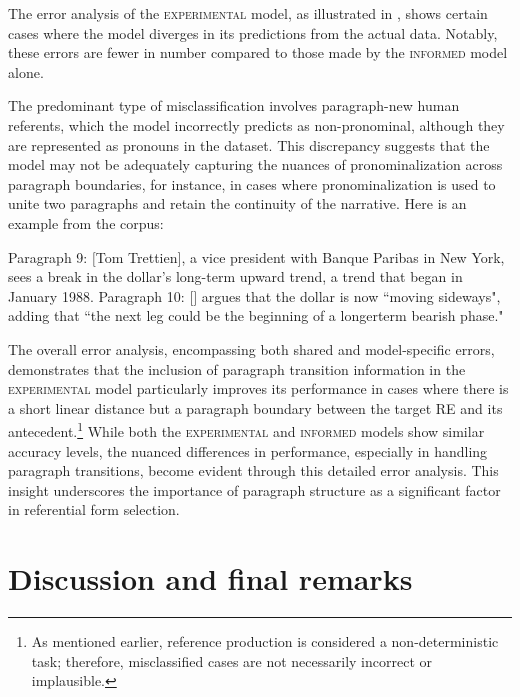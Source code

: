 The error analysis of the \textsc{experimental} model, as illustrated in , shows certain cases where the model diverges in its predictions from the actual data. Notably, these errors are fewer in number compared to those made by the \textsc{informed} model alone.

{\renewcommand\normalsize{\footnotesize}%
	\normalsize
	}

The predominant type of misclassification involves paragraph-new human referents, which the model incorrectly predicts as non-pronominal, although they are represented as pronouns in the dataset. This discrepancy suggests that the model may not be adequately capturing the nuances of pronominalization across paragraph boundaries, for instance, in cases where pronominalization is used to unite two paragraphs and retain the continuity of the narrative. Here is an example from the corpus:


\begin{exe}
	\ex \example{wsj-1102}
	\begin{xlist}
		\ex Paragraph 9: $[$Tom Trettien$]$, a vice president with Banque Paribas in New York, sees a break in the dollar's long-term upward trend, a trend that began in January 1988.
		\ex Paragraph 10: $[$$]$ argues that the dollar is now ``moving sideways", adding that ``the next leg could be the beginning of a longerterm bearish phase."
	\end{xlist} 
\end{exe}


The overall error analysis, encompassing both shared and model-specific errors, demonstrates that the inclusion of paragraph transition information in the \textsc{experimental} model particularly improves its performance in cases where there is a short linear distance but a paragraph boundary between the target RE and its antecedent.\footnote{As mentioned earlier, reference production is considered a non-deterministic task; therefore, misclassified cases are not necessarily incorrect or implausible.} While both the \textsc{experimental} and \textsc{informed} models show similar accuracy levels, the nuanced differences in performance, especially in handling paragraph transitions, become evident through this detailed error analysis. This insight underscores the importance of paragraph structure as a significant factor in referential form selection.

\section{Discussion and final remarks}

